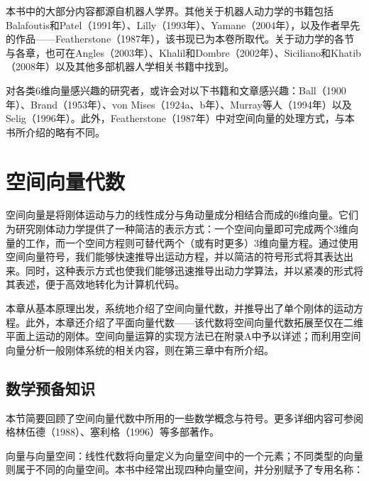 \documentclass[10pt,a4paper]{book}
\theoremstyle{thmstyle} %
\theoremstyle{defstyle} %
\theoremstyle{prostyle} %
\begin{document}
本书中的大部分内容都源自机器人学界。其他关于机器人动力学的书籍包括Balafoutis和Patel（1991年）、Lilly（1993年）、Yamane（2004年），以及作者早先的作品——Featherstone（1987年），该书现已为本卷所取代。关于动力学的各节与各章，也可在Angles（2003年）、Khalil和Dombre（2002年）、Siciliano和Khatib（2008年）以及其他多部机器人学相关书籍中找到。



对各类6维向量感兴趣的研究者，或许会对以下书籍和文章感兴趣：Ball（1900年）、Brand（1953年）、von Mises（1924a、b年）、Murray等人（1994年）以及Selig（1996年）。此外，Featherstone（1987年）中对空间向量的处理方式，与本书所介绍的略有不同。



\chapter{空间向量代数}







空间向量是将刚体运动与力的线性成分与角动量成分相结合而成的6维向量。它们为研究刚体动力学提供了一种简洁的表示方式：一个空间向量即可完成两个3维向量的工作，而一个空间方程则可替代两个（或有时更多）3维向量方程。通过使用空间向量符号，我们能够快速推导出运动方程，并以简洁的符号形式将其表达出来。同时，这种表示方式也使我们能够迅速推导出动力学算法，并以紧凑的形式将其表述，便于高效地转化为计算机代码。



本章从基本原理出发，系统地介绍了空间向量代数，并推导出了单个刚体的运动方程。此外，本章还介绍了平面向量代数——该代数将空间向量代数拓展至仅在二维平面上运动的刚体。空间向量运算的实现方法已在附录A中予以详述；而利用空间向量分析一般刚体系统的相关内容，则在第三章中有所介绍。



\section{数学预备知识}





本节简要回顾了空间向量代数中所用的一些数学概念与符号。更多详细内容可参阅格林伍德（1988）、塞利格（1996）等多部著作。



向量与向量空间：线性代数将向量定义为向量空间中的一个元素；不同类型的向量则属于不同的向量空间。本书中经常出现四种向量空间，并分别赋予了专用名称：
\end{document}
